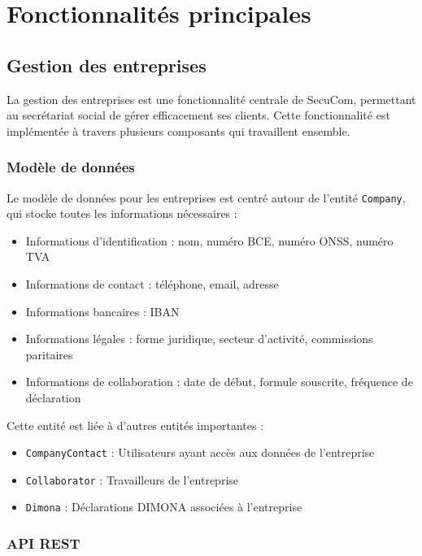 \documentclass[12pt,a4paper]{report}
\begin{document}
\section{Fonctionnalités principales}

\subsection{Gestion des entreprises}

La gestion des entreprises est une fonctionnalité centrale de SecuCom, permettant au secrétariat social de gérer efficacement ses clients. Cette fonctionnalité est implémentée à travers plusieurs composants qui travaillent ensemble.

\subsubsection{Modèle de données}

Le modèle de données pour les entreprises est centré autour de l'entité \texttt{Company}, qui stocke toutes les informations nécessaires :

\begin{itemize}
  \item Informations d'identification : nom, numéro BCE, numéro ONSS, numéro TVA
  \item Informations de contact : téléphone, email, adresse
  \item Informations bancaires : IBAN
  \item Informations légales : forme juridique, secteur d'activité, commissions paritaires
  \item Informations de collaboration : date de début, formule souscrite, fréquence de déclaration
\end{itemize}

Cette entité est liée à d'autres entités importantes :
\begin{itemize}
  \item \texttt{CompanyContact} : Utilisateurs ayant accès aux données de l'entreprise
  \item \texttt{Collaborator} : Travailleurs de l'entreprise
  \item \texttt{Dimona} : Déclarations DIMONA associées à l'entreprise
\end{itemize}

\subsubsection{API REST}
\end{document}
